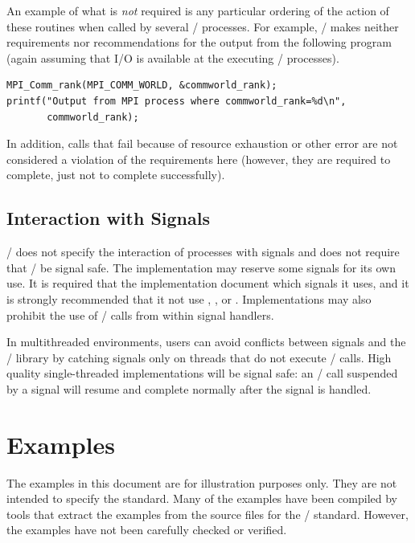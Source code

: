 An example of what is \emph{not} required is any particular ordering
of the action of these routines when called by several \MPI/ processes.  For
example, \MPI/ makes neither requirements nor recommendations for the
output from the following program (again assuming that
I/O is available at the executing \MPI/ processes).
\begin{lstlisting}[language={[MPI]C}]
MPI_Comm_rank(MPI_COMM_WORLD, &commworld_rank);
printf("Output from MPI process where commworld_rank=%d\n",
       commworld_rank);
\end{lstlisting}

In addition, calls that fail because of resource exhaustion or other
error are not considered a violation of the requirements here (however,
they are required to complete, just not to complete successfully).

\subsection{Interaction with Signals}

\MPI/ does not specify the interaction of processes with signals and does
not require that \MPI/ be signal safe.  The
implementation may reserve some signals for its own use.  It is
required that the implementation document which signals it uses, and
it is strongly recommended that it not use , ,
or .  Implementations may also prohibit the use of \MPI/
calls from within signal handlers.

 In multithreaded environments, users can avoid conflicts between
signals and the \MPI/ library by catching signals only on threads that
do not execute \MPI/ calls.  High quality single-threaded
implementations will be signal safe: an \MPI/ call suspended by a
signal will resume and complete normally after the signal is handled.

\section{Examples}
The examples in this document are for illustration purposes only. They are not
intended to specify the standard.  Many of the examples have been
compiled by tools that extract the examples from the source files for the
\MPI/ standard.  However, the examples have not been
carefully checked or verified.

\setcounter{topnumber}{2}%
\setcounter{totalnumber}{3}%
